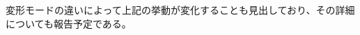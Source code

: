 \documentclass[uplatex,dvipdfmx,a4paper,10pt]{jsarticle}
\makeatletter
\def\section{\@startsection {section}{1}{\z@}{1.5 ex plus 2ex minus -.2ex}{0.5 ex plus .2ex}{\large\bf}}
\makeatother
\begin{document}
変形モードの違いによって上記の挙動が変化することも見出しており、その詳細についても報告予定である。




\end{document}
